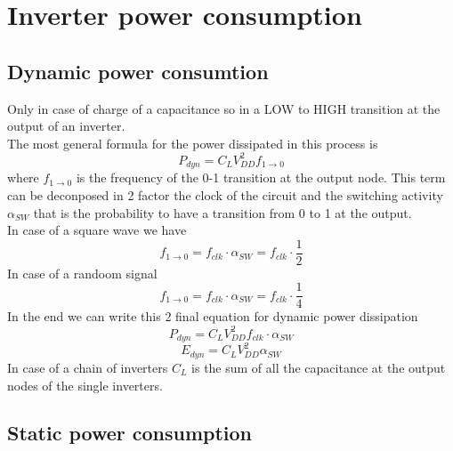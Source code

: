 \chapter{Inverter power consumption}

\section{Dynamic power consumtion}
Only in case of charge of a capacitance so in a LOW to HIGH transition at the output of an inverter. \\
The most general formula for the power dissipated in this process is
\begin{equation}
P_{dyn}=C_LV_{DD}^2f_{1\rightarrow 0}
\end{equation}
where $f_{1\rightarrow 0}$ is the frequency of the 0-1 transition at the output node. This term can be deconposed in 2 factor the clock of the circuit and the switching activity $\alpha_{SW}$ that is the probability to have a transition from 0 to 1 at the output.\\
\vspace{2mm}
\tab In case of a square wave we have 
\begin{equation}
f_{1\rightarrow 0}=f_{clk}\cdot \alpha_{SW}=f_{clk}\cdot \frac{1}{2}
\end{equation}
\tab In case of a randoom signal 
\begin{equation}
f_{1\rightarrow 0}=f_{clk}\cdot \alpha_{SW}=f_{clk}\cdot \frac{1}{4}
\end{equation}
\vspace{5mm}
In the end we can write this 2 final equation for dynamic power dissipation
\begin{equation}
P_{dyn}=C_LV_{DD}^2 f_{clk}\cdot \alpha_{SW}
\end{equation}
\begin{equation}
E_{dyn}=C_LV_{DD}^2\alpha_{SW}
\end{equation}
In case of a chain of inverters $C_L$ is the sum of all the capacitance at the output nodes of the single inverters.\\

\section{Static power consumption}
